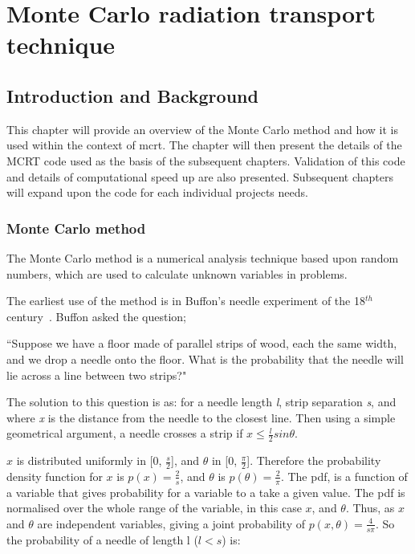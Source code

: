 \chapter{Monte Carlo radiation transport technique}
\label{sec:mcrt}
\section{Introduction and Background}
This chapter will provide an overview of the Monte Carlo method and how it is used within the context of \gls{mcrt}. The chapter will then present the details of the \gls{MCRT} code used as the basis of the subsequent chapters. Validation of this code and details of computational speed up are also presented. Subsequent chapters will expand upon the code for each individual projects needs.

\subsection{Monte Carlo method}\label{sec:mcmethod}
The Monte Carlo method is a numerical analysis technique based upon random numbers, which are used to calculate unknown variables in problems. 

The earliest use of the method is in Buffon's needle experiment of the 18$^{th}$ century~\cite{badger1994lazzarini,beckmann2015history,buffon1785histoire}. Buffon asked the question;

\medskip

``Suppose we have a floor made of parallel strips of wood, each the same width, and we drop a needle onto the floor. What is the probability that the needle will lie across a line between two strips?"

\medskip

The solution to this question is as:
for a needle length \textit{l}, strip separation \textit{s}, and where \textit{x} is the distance from the needle to the closest line. Then using a simple geometrical argument, a needle crosses a strip if $x \leq \tfrac{l}{2} sin \theta$.

$x$ is distributed uniformly in [0, $\tfrac{s}{2}$], and $\theta$ in [0, $\tfrac{\pi}{2}$]. Therefore the probability density function for $x$ is $p(x)=\tfrac{2}{s}$, and $\theta$ is $p(\theta) = \tfrac{2}{\pi}$. The \gls{pdf}, is a function of a variable that gives probability for a variable to a take a given value. The \gls{pdf} is normalised over the whole range of the variable, in this case $x$, and $\theta$.
Thus, as $x$ and $\theta$ are independent variables, giving a joint probability of $p(x,\theta) = \tfrac{4}{s \pi}$.
So the probability of a needle of length l ($l<s$) is:

